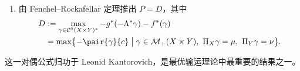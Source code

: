 \begin{exercise}[原讲义 B.5 练习 30]
\begin{enumerate}[label=\arabic*.]
  $\Pi_X\gamma:\phi\in\mathcal C^0(X)\mapsto\gamma(\phi\oplus0)$；$Y$ 上的边缘分布 $\Pi_Y\gamma$ 类似定义。证明 $\Lambda$ 的伴随算子由
  \[
    \Lambda^*(\gamma)=(\Pi_X\gamma,\Pi_Y\gamma)\in\mathcal M(X)\times\mathcal M(Y)
  \]
  给出。
  \item 由 Fenchel--Rockafellar 定理推出 $P=D$，其中
  \[
    \begin{aligned}
    D&:=\max_{\gamma\in\mathcal C^0(X\times Y)^*}-g^*(-\Lambda^*\gamma)-f^*(\gamma)\\
    &=\max\bigl\{-\pair{\gamma}{c}\bigm|\gamma\in\mathcal M_+(X\times Y),\ \Pi_X\gamma=\mu,\ \Pi_Y\gamma=\nu\bigr\}.
    \end{aligned}
  \]
\end{enumerate}
这一对偶公式归功于 Leonid Kantorovich，是最优输运理论中最重要的结果之一。
\end{exercise}
